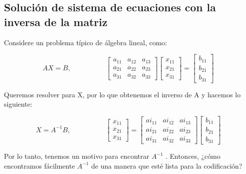 \documentclass[11pt]{article}
\begin{document}
    \hypertarget{soluciuxf3n-de-sistema-de-ecuaciones-con-la-inversa-de-la-matriz}{%
\subsection{Solución de sistema de ecuaciones con la inversa de la
matriz}\label{soluciuxf3n-de-sistema-de-ecuaciones-con-la-inversa-de-la-matriz}}

Considere un problema típico de álgebra lineal, como:

\begin{equation}
	AX = B, \hspace {5em} \begin {bmatrix} a_{11} & a_{12} & a_ {13} \\ a_{21} & a_{22} & a_{23} \\ a_{31} & a_{32} & a_{33} \end {bmatrix} \begin {bmatrix} x_{11} \\ x_{21} \\ x_{31} \end {bmatrix} = \begin {bmatrix} b_{11} \\ b_{21 } \\ b_{31} \end {bmatrix}
\end{equation}

Queremos resolver para X, por lo que obtenemos el inverso de A y hacemos lo siguiente:

\begin{equation}
	X = A^{- 1} B, \hspace {5em} \begin {bmatrix} x_{11} \\ x_{21} \\ x_{31} \end {bmatrix} = \begin {bmatrix} ai_{11 } & ai_{12} & ai_{13} \\ ai_{21} & ai_{22} & ai_{23} \\ ai_{31} & ai_{32} & ai_{33} \end {bmatrix} \begin {bmatrix} b_{11 } \\ b_{21} \\ b_{31} \end {bmatrix}
\end{equation}

Por lo tanto, tenemos un motivo para encontrar $A^{- 1}$ . Entonces, ¿cómo encontramos fácilmente $A^{- 1}$ de una manera que esté lista para la codificación?
\end{document}
